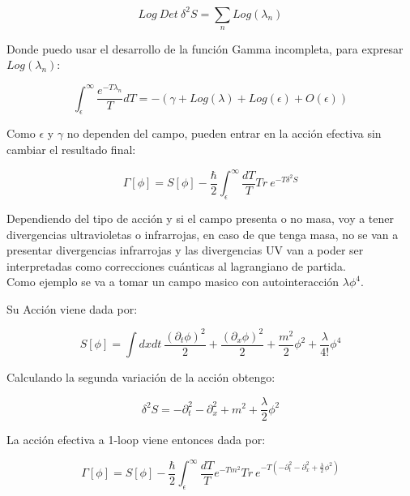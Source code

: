 \begin{equation}
Log \ Det \ \delta ^2 S = 
\sum _n Log( \lambda _n )
\end{equation}

Donde puedo usar el desarrollo de la función Gamma incompleta, para expresar $Log ( \lambda _n )$:

\begin{equation}
\int _ { \epsilon } ^{\infty} \frac{e ^{- T \lambda _n}}{T} dT =
- \left(
		\gamma + Log ( \lambda ) + Log( \epsilon )  + O ( \epsilon  ) 
		\right)
\end{equation}

Como  $ \epsilon $ y $ \gamma $ no dependen del campo, pueden entrar en la acción efectiva sin cambiar el resultado final:

\begin{equation}
\Gamma [ \phi ] = 
S[ \phi ] - 
\frac{\hbar }{2}
\int _ { \epsilon } ^{\infty} \frac{ dT}{T} Tr \  e ^{- T \delta ^2 S}
\end{equation}

Dependiendo del tipo de acción y si el campo presenta o no masa, voy a tener divergencias ultravioletas o infrarrojas, en caso de que tenga masa, no se van a presentar divergencias infrarrojas y las divergencias UV van a poder ser interpretadas como correcciones cuánticas al lagrangiano de partida. \\


Como ejemplo se va a tomar un campo masico con autointeracción $\lambda \phi ^4 $.

Su Acción viene dada por:

\begin{equation}
S[ \phi ] = \int dx dt \ 
\frac{( \partial _t \phi ) ^2}{2} +  
\frac{( \partial _x \phi ) ^2}{2} +
\frac{m ^2 }{2} \phi ^2 +
\frac{\lambda}{4!} \phi ^4 
\end{equation}

Calculando la segunda variación de la acción obtengo:

\begin{equation}
\delta ^2 S = 
- \partial _t ^2 
- \partial _x ^2 
+ m ^2 
+ \frac{\lambda}{2}\phi ^2 
\end{equation}

La acción efectiva a 1-loop viene entonces dada por:

\begin{equation}
\Gamma [ \phi ] = 
S[ \phi ] - 
\frac{\hbar }{2}
\int _ { \epsilon } ^{\infty} \frac{ dT}{T} 
e ^{- T m ^2 }
Tr \  e ^{- T ( - \partial _t ^2 - \partial _x ^2 + \frac{\lambda}{2} \phi ^2 ) }
\end{equation}

